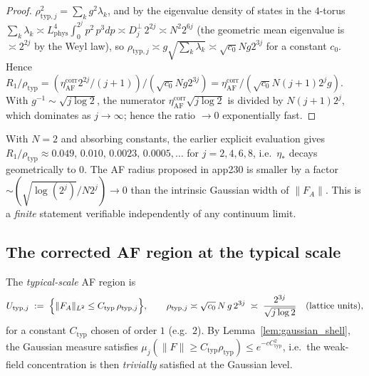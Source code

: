 \begin{proof}
$\rho_{\mathrm{typ},j}^2=\sum_k g^2\lambda_k$, and by the eigenvalue
density of states in the $4$-torus $\sum_k\lambda_k\asymp L_{\mathrm{phys}}
^4\int_0^{2^j}p^2\,p^3dp\asymp D_j^\perp\,2^{2j}\asymp N^2 2^{6j}$ (the
geometric mean eigenvalue is $\asymp2^{2j}$ by the Weyl law), so
$\rho_{\mathrm{typ},j}\asymp g\sqrt{\sum_k\lambda_k}\asymp
\sqrt{c_0}N g 2^{3j}$ for a constant $c_0$. Hence
$R_1/\rho_{\mathrm{typ}}=(\eta_{\mathrm{AF}}^{\mathrm{corr}}2^{2j}/(j+1))
/(\sqrt{c_0}N g 2^{3j})=\eta_{\mathrm{AF}}^{\mathrm{corr}}/(\sqrt{c_0}N
(j+1)2^{j}g)$. With $g^{-1}\sim\sqrt{j\log2}$, the numerator
$\eta_{\mathrm{AF}}^{\mathrm{corr}}\sqrt{j\log2}$ is divided by
$N(j+1)2^j$, which dominates as $j\to\infty$; hence the ratio $\to0$
exponentially fast.
\end{proof}

\begin{remark}
\label{rem:gaussian_numeric}
With $N=2$ and absorbing constants, the earlier explicit evaluation
gives $R_1/\rho_{\mathrm{typ}}\approx0.049,\,0.010,\,0.0023,\,
0.0005,\dots$ for $j=2,4,6,8$, i.e.\ $\eta_*$ decays geometrically to
$0$. The AF radius proposed in app230 is smaller by a factor
$\sim(\sqrt{\log(2^j)}/N2^j)\to0$ than the intrinsic Gaussian width of
$\|F_A\|$. This is a \emph{finite} statement verifiable independently of
any continuum limit.
\end{remark}

\subsection{The corrected AF region at the typical scale}

\begin{definition}
\label{def:typical_af}
The \emph{typical-scale} AF region is
\begin{equation}
\label{eq:typical_af}
  U_{\mathrm{typ},j}\;:=\;\Bigl\{\|F_A\|_{L^2}\le C_{\mathrm{typ}}\,
  \rho_{\mathrm{typ},j}\Bigr\},\qquad
  \rho_{\mathrm{typ},j}\asymp \sqrt{c_0}\,N\,g\,2^{3j}
  \;\asymp\;\frac{2^{3j}}{\sqrt{j\log 2}}\quad(\text{lattice units}),
\end{equation}
for a constant $C_{\mathrm{typ}}$ chosen of order $1$ (e.g.\ $2$).
By Lemma~\ref{lem:gaussian_shell}, the Gaussian measure satisfies
$\mu_j(\|F\|\ge C_{\mathrm{typ}}\rho_{\mathrm{typ}})\le
e^{-cC_{\mathrm{typ}}^2}$, i.e.\ the weak-field concentration is then
\emph{trivially} satisfied at the Gaussian level.
\end{definition}

